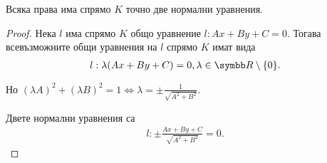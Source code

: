 \documentclass[numbers=endperiod, bibliography=totocnumbered]{scrartcl}
\begin{document}
\begin{proposition}
  Всяка права има спрямо \( K \) точно две нормални уравнения.
\end{proposition}
\begin{proof}
  Нека \( l \) има спрямо \( K \) общо уравнение \( l: Ax + By + C = 0 \). Тогава всевъзможните общи уравнения на \( l \) спрямо \( K \) имат вида
  \begin{align*}
    l: \lambda(Ax + By + C) = 0, \lambda \in \R \setminus \{ 0 \}.
  \end{align*}

  Но \( {(\lambda A)}^2 + {(\lambda B)}^2 = 1 \iff \lambda = \pm \frac 1 {\sqrt{A^2 + B^2}} \).

  Двете нормални уравнения са
  \begin{align*}
    l: \pm \frac {Ax + By + C} {\sqrt{A^2 + B^2}} = 0.
  \end{align*}
\end{proof}
\end{document}

